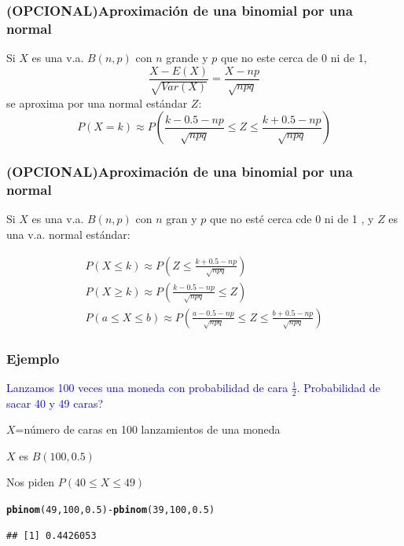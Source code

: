 \documentclass[handout]{beamer}\usepackage[]{graphicx}\usepackage[]{color}
\makeatletter
\newcommand{\hlnum}[1]{\textcolor[rgb]{0.686,0.059,0.569}{#1}}%
\newcommand{\hlopt}[1]{\textcolor[rgb]{0,0,0}{#1}}%
\newcommand{\hlstd}[1]{\textcolor[rgb]{0.345,0.345,0.345}{#1}}%
\newcommand{\hlkwd}[1]{\textcolor[rgb]{0.737,0.353,0.396}{\textbf{#1}}}%
\newenvironment{kframe}{%
 \def\at@end@of@kframe{}%
 \ifinner\ifhmode%
  \def\at@end@of@kframe{\end{minipage}}%
  \begin{minipage}{\columnwidth}%
 \fi\fi%
 \def\FrameCommand##1{\hskip\@totalleftmargin \hskip-\fboxsep
 \colorbox{shadecolor}{##1}\hskip-\fboxsep
     \hskip-\linewidth \hskip-\@totalleftmargin \hskip\columnwidth}%
 \MakeFramed {\advance\hsize-\width
   \@totalleftmargin\z@ \linewidth\hsize
   \@setminipage}}%
 {\par\unskip\endMakeFramed%
 \at@end@of@kframe}
\newenvironment{knitrout}{}{} %
\newcommand{\blue}[1]{\textcolor{blue}{#1}}
\renewcommand{\leq}{\leqslant}
\renewcommand{\geq}{\geqslant}
\theoremstyle{plain}
\theoremstyle{definition}
\makeatother
\begin{document}
\begin{frame}
\frametitle{(OPCIONAL)Aproximación de una binomial por una normal}
\vspace*{-2ex}

Si $X$ es una v.a. $B(n,p)$ con $n$ grande y $p$ que no  este cerca de  0  ni de  1,
$$
\frac{X-E(X)}{\sqrt{Var(X)}}=\frac{X-np}{\sqrt{npq}}
$$
se aproxima por  una normal estándar $Z$:
$$
P(X=k) \approx P\left(\frac{k-0.5-np}{\sqrt{npq}}\leq Z \leq \frac{k+0.5-np}{\sqrt{npq}}\right)
$$


\end{frame}









\begin{frame}
\frametitle{(OPCIONAL)Aproximación de una binomial por una normal}

Si $X$ es una v.a. $B(n,p)$ con  $n$ gran y $p$ que no esté cerca cde 0 ni de 1 , y $Z$ es una v.a. normal estándar:



$$
\begin{array}{l}
P(X\leq k)  \displaystyle\approx P\left(Z \leq
\frac{{k+0.5-np}}{\sqrt{npq}}\right)\\[3ex]
P(X\geq k)  \displaystyle\approx P\left(
\frac{{k-0.5-np}}{\sqrt{npq}}\leq Z\right)\\[3ex]
P(a\leq X\leq b) \displaystyle\approx
P\left(\frac{a-0.5-np}{\sqrt{npq}}\leq Z \leq
\frac{b+0.5-np}{\sqrt{npq}}\right)
\end{array}
$$
\end{frame}




\begin{frame}[fragile]
\frametitle{Ejemplo}
\blue{Lanzamos 100 veces una moneda con probabilidad de cara $\frac{1}{2}$.
Probabilidad de sacar  40 y 49 caras?}
\bigskip

 $X$=número de caras en 100 lanzamientos de una moneda
 \medskip
 
$X$  es $B(100,0.5)$
 \medskip
 
 
 
 Nos piden $P(40\leq X\leq 49)$
 \medskip

\begin{knitrout}
\color{fgcolor}\begin{kframe}
\begin{alltt}
\hlkwd{pbinom}\hlstd{(}\hlnum{49}\hlstd{,}\hlnum{100}\hlstd{,}\hlnum{0.5}\hlstd{)}\hlopt{-}\hlkwd{pbinom}\hlstd{(}\hlnum{39}\hlstd{,}\hlnum{100}\hlstd{,}\hlnum{0.5}\hlstd{)}
\end{alltt}
\begin{verbatim}
## [1] 0.4426053
\end{verbatim}
\end{kframe}
\end{knitrout}

\end{frame}
\end{document}

